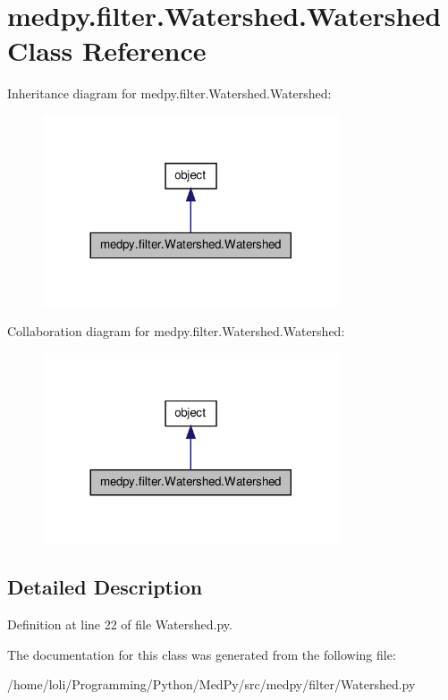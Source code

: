 \hypertarget{classmedpy_1_1filter_1_1Watershed_1_1Watershed}{
\section{medpy.filter.Watershed.Watershed Class Reference}
\label{classmedpy_1_1filter_1_1Watershed_1_1Watershed}
}


Inheritance diagram for medpy.filter.Watershed.Watershed:\nopagebreak
\begin{figure}[H]
\begin{center}
\leavevmode
\includegraphics[width=248pt]{classmedpy_1_1filter_1_1Watershed_1_1Watershed__inherit__graph}
\end{center}
\end{figure}


Collaboration diagram for medpy.filter.Watershed.Watershed:\nopagebreak
\begin{figure}[H]
\begin{center}
\leavevmode
\includegraphics[width=248pt]{classmedpy_1_1filter_1_1Watershed_1_1Watershed__coll__graph}
\end{center}
\end{figure}


\subsection{Detailed Description}


Definition at line 22 of file Watershed.py.



The documentation for this class was generated from the following file:\begin{DoxyCompactItemize}
\item 
/home/loli/Programming/Python/MedPy/src/medpy/filter/Watershed.py\end{DoxyCompactItemize}
